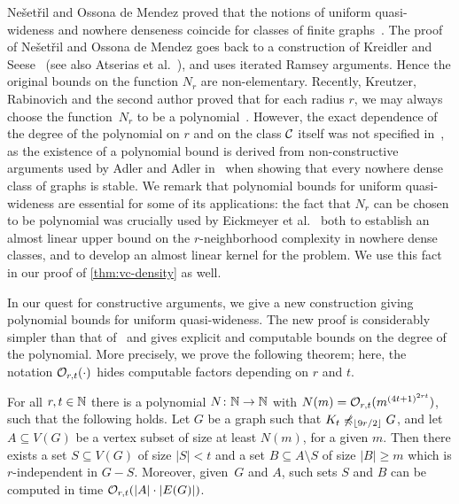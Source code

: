Ne\v{s}et\v{r}il and Ossona de Mendez proved that
the notions of uniform quasi-wideness and nowhere denseness coincide for 
classes of finite graphs~\cite{nevsetvril2011nowhere}. 
The proof of Ne\v{s}et\v{r}il 
and Ossona de Mendez goes back to a construction
of Kreidler and Seese~\cite{kreidler1998monadic} (see also Atserias et al.~\cite{atserias2006preservation}), 
and uses iterated Ramsey arguments. Hence the original bounds on 
the function $N_r$ are non-elementary. Recently, Kreutzer, Rabinovich and the second author
 proved that for each radius $r$, we may always choose the function~$N_r$ to be a polynomial~\cite{siebertz2016polynomial}. 
 However, the exact dependence of the degree of the polynomial on $r$ and on the class $\mathcal{C}$ itself
 was not specified in~\cite{siebertz2016polynomial}, as the existence of a polynomial bound is derived
from non-constructive arguments used by Adler and Adler in~\cite{adler2014interpreting} when showing that every nowhere dense class of graphs
is stable. We remark that polynomial bounds for uniform quasi-wideness are essential for some of its applications:
the fact that $N_r$ can be chosen to be polynomial was crucially used by Eickmeyer et al.~\cite{eickmeyer2016neighborhood} both to establish an almost linear upper bound on the
$r$-neighborhood complexity in nowhere dense classes, and to develop an almost linear kernel for the {} problem.
We use this fact in our proof of \cref{thm:vc-density} as well.

In our quest for constructive arguments, we give a new construction giving polynomial bounds for uniform quasi-wideness.
The new proof is considerably simpler than that of~\cite{siebertz2016polynomial}
and gives explicit and computable bounds on the degree of the polynomial.
More precisely, we prove the following theorem; here, the notation $\mathcal{O}_{r,t}(\cdot)$ hides computable factors depending on $r$ and $t$.

\setcounter{uqw}{\thetheorem}
\begin{theorem}\label{thm:new-uqw}
For all $r,t\in \mathbb{N}$ there is a polynomial  $N\colon \mathbb{N}\to \mathbb{N}$ with $N(m)=
\mathcal{O}_{r,t}{(m^{{(4t+1)}^{2rt}})}$, such that the following holds.
Let $G$ be a graph such that $K_t\not\preccurlyeq_{\lfloor 9r/2\rfloor} G$, and
let $A\subseteq V(G)$ be a vertex subset of size at least $N(m)$, for a given $m$.
Then there exists a set $S\subseteq V(G)$ of size $|S|<t$ and a set $B\subseteq A\setminus S$ 
of size $|B|\geq m$ which is $r$-independent in $G-S$.
Moreover, given~$G$ and $A$, such sets $S$ and $B$ can be computed in time $\mathcal{O}_{r,t}(|A|\cdot |E(G)|)$. 
\end{theorem}

